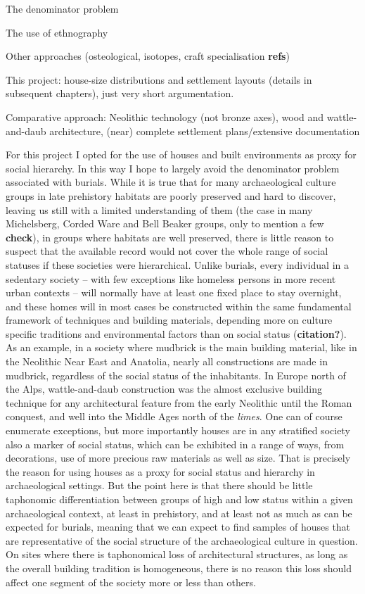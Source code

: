 \documentclass[
  12pt,
]{book}
\begin{document}
The denominator problem

The use of ethnography

Other approaches (osteological, isotopes, craft specialisation \textbf{refs})

This project: house-size distributions and settlement layouts (details in subsequent chapters), just very short argumentation.

Comparative approach: Neolithic technology (not bronze axes), wood and wattle-and-daub architecture, (near) complete settlement plans/extensive documentation

For this project I opted for the use of houses and built environments as proxy for social hierarchy. In this way I hope to largely avoid the denominator problem associated with burials. While it is true that for many archaeological culture groups in late prehistory habitats are poorly preserved and hard to discover, leaving us still with a limited understanding of them (the case in many Michelsberg, Corded Ware and Bell Beaker groups, only to mention a few \textbf{check}), in groups where habitats are well preserved, there is little reason to suspect that the available record would not cover the whole range of social statuses if these societies were hierarchical. Unlike burials, every individual in a sedentary society -- with few exceptions like homeless persons in more recent urban contexts -- will normally have at least one fixed place to stay overnight, and these homes will in most cases be constructed within the same fundamental framework of techniques and building materials, depending more on culture specific traditions and environmental factors than on social status (\textbf{citation?}). As an example, in a society where mudbrick is the main building material, like in the Neolithic Near East and Anatolia, nearly all constructions are made in mudbrick, regardless of the social status of the inhabitants. In Europe north of the Alps, wattle-and-daub construction was the almost exclusive building technique for any architectural feature from the early Neolithic until the Roman conquest, and well into the Middle Ages north of the \emph{limes}. One can of course enumerate exceptions, but more importantly houses are in any stratified society also a marker of social status, which can be exhibited in a range of ways, from decorations, use of more precious raw materials as well as size. That is precisely the reason for using houses as a proxy for social status and hierarchy in archaeological settings. But the point here is that there should be little taphonomic differentiation between groups of high and low status within a given archaeological context, at least in prehistory, and at least not as much as can be expected for burials, meaning that we can expect to find samples of houses that are representative of the social structure of the archaeological culture in question. On sites where there is taphonomical loss of architectural structures, as long as the overall building tradition is homogeneous, there is no reason this loss should affect one segment of the society more or less than others.
\end{document}
